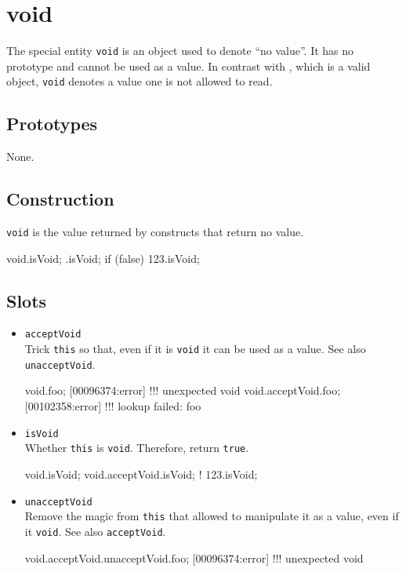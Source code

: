 \section{void}

The special entity \lstinline|void| is an object used to denote ``no
value''.  It has no prototype and cannot be used as a value.  In
contrast with , which is a valid object,
\lstinline|void| denotes a value one is not allowed to read.

\subsection{Prototypes}

None.

\subsection{Construction}

\lstinline|void| is the value returned by constructs that return no
value.

\begin{urbiassert}
void.isVoid;
{}.isVoid;
{if (false) 123}.isVoid;
\end{urbiassert}

\subsection{Slots}

\begin{itemize}
\item \lstinline|acceptVoid|\\
  Trick \lstinline|this| so that, even if it is \lstinline|void| it
  can be used as a value.  See also \lstinline|unacceptVoid|.
\begin{urbiscript}[firstnumber=last]
void.foo;
[00096374:error] !!! unexpected void
void.acceptVoid.foo;
[00102358:error] !!! lookup failed: foo
\end{urbiscript}

\item \lstinline|isVoid|\\
  Whether \lstinline|this| is \lstinline|void|.  Therefore, return
  \lstinline|true|.
\begin{urbiassert}[firstnumber=last]
void.isVoid;
void.acceptVoid.isVoid;
! 123.isVoid;
\end{urbiassert}

\item \lstinline|unacceptVoid|\\
  Remove the magic from \lstinline|this| that allowed to manipulate it
  as a value, even if it \lstinline|void|.  See also
  \lstinline|acceptVoid|.
\begin{urbiscript}[firstnumber=last]
void.acceptVoid.unacceptVoid.foo;
[00096374:error] !!! unexpected void
\end{urbiscript}

\end{itemize}




